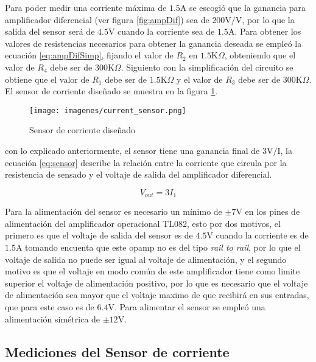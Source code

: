     Para poder medir una corriente máxima de $1.5\text{A}$ se escogió que la ganancia
    para amplificador diferencial (ver figura \ref{fig:ampDif}) sea de $200\text{V/V}$, por lo que la salida del
    sensor será de $4.5\text{V}$ cuando la corriente sea de $1.5\text{A}$. Para obtener
    los valores de resistencias necesarios para obtener la ganancia deseada se
    empleó la ecuación \ref{eq:ampDifSimp}, fijando el valor de $R_2$ en $1.5\text{K}\Omega$,
    obteniendo que el valor de $R_4$ debe ser de $300\text{K}\Omega$. Siguiento con la
    simplificación del circuito se obtiene que el valor de $R_1$ debe ser de $1.5\text{K}\Omega$
    y el valor de $R_3$ debe ser de $300\text{K}\Omega$. El sensor de corriente diseñado
    se muestra en la figura \ref{fig:sensor_corriente}.

    \begin{figure}[H]
        \centering
        \texttt{[image: imagenes/current\_sensor.png]}
        \caption{Sensor de corriente diseñado}
        \label{fig:sensor_corriente}
    \end{figure}

    con lo explicado anteriormente, el sensor tiene una ganancia final de 
    $3\text{V/I}$, la ecuación \ref{eq:sensor} describe la relación entre
    la corriente que circula por la resistencia de sensado y el voltaje de salida
    del amplificador diferencial.

    \begin{equation}
        V_{out} = 3I_1
        \label{eq:sensor}
    \end{equation}
    
    Para la alimentación del sensor es necesario un mínimo de $\pm7\text{V}$ en
    los pines de alimentación del amplificador operacional TL082, esto por dos 
    motivos, el primero es que el voltaje de salida del sensor es de $4.5\text{V}$
    cuando la corriente es de $1.5\text{A}$ tomando encuenta que este opamp 
    no es del tipo \textit{rail to rail}, por lo que el voltaje de salida no
    puede ser igual al voltaje de alimentación, y el segundo motivo es que el
    voltaje en modo común de este amplificador tiene como limite superior el
    voltaje de alimentación positivo, por lo que es necesario que el voltaje 
    de alimentación sea mayor que el voltaje maximo de que recibirá en sus entradas,
    que para este caso es de $6.4\text{V}$. Para alimentar el sensor se empleó
    una alimentación simétrica de $\pm 12\text{V}$.

    
    \subsection{Mediciones del Sensor de corriente}

